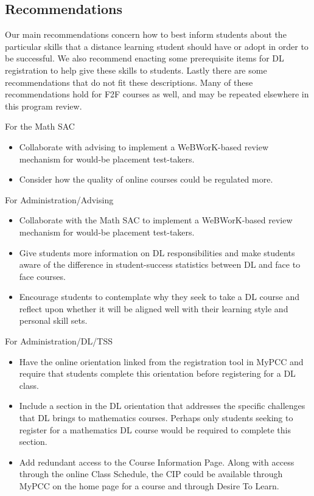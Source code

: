 \subsection{Recommendations}
Our main recommendations concern how to best inform students about the particular skills that a distance learning student should have or adopt in order to be successful. We also recommend enacting some prerequisite items for DL registration to help give these skills to students. Lastly there are some recommendations that do not fit these descriptions. Many of these recommendations hold for F2F courses as well, and may be repeated elsewhere in this program review. 
\begin{description}
\item For the Math SAC
\begin{itemize}
\item Collaborate with advising to implement a WeBWorK-based review mechanism for would-be placement test-takers.
\item Consider how the quality of online courses could be regulated more. 
\end{itemize}
\item For Administration/Advising
\begin{itemize}
\item Collaborate with the Math SAC to implement a WeBWorK-based review mechanism for would-be placement test-takers.
\item Give students more information on DL responsibilities and make students aware of the difference in student-success statistics between DL and face to face courses.
\item Encourage students to contemplate why they seek to take a DL course and reflect upon whether it will be aligned well with their learning style and personal skill sets.
\end{itemize}
\item For Administration/DL/TSS
\begin{itemize}
\item Have the online orientation linked from the registration tool in MyPCC and require that students complete this orientation before registering for a DL class.
\item Include a section in the DL orientation that addresses the specific challenges that DL brings to mathematics courses. Perhaps only students seeking to register for a mathematics DL course would be required to complete this section.
\item Add redundant access to the Course Information Page. Along with access through the online Class Schedule, the CIP could be available through MyPCC on the home page for a course and through Desire To Learn.

\end{itemize}
\end{description}
